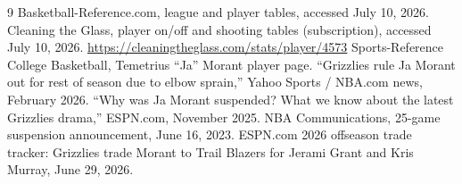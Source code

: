 \documentclass[11pt]{article}
\begin{document}
\begin{thebibliography}{9}
 Basketball-Reference.com, league and player tables, accessed July 10, 2026.
 Cleaning the Glass, player on/off and shooting tables (subscription),
accessed July 10, 2026. \url{https://cleaningtheglass.com/stats/player/4573}
 Sports-Reference College Basketball, Temetrius ``Ja'' Morant player page.
 ``Grizzlies rule Ja Morant out for rest of season due to elbow sprain,''
Yahoo Sports / NBA.com news, February 2026.
 ``Why was Ja Morant suspended? What we know about the latest Grizzlies
drama,'' ESPN.com, November 2025.
 NBA Communications, 25-game suspension announcement, June 16, 2023.
 ESPN.com 2026 offseason trade tracker: Grizzlies trade Morant to Trail
Blazers for Jerami Grant and Kris Murray, June 29, 2026.
\end{thebibliography}
\end{document}
